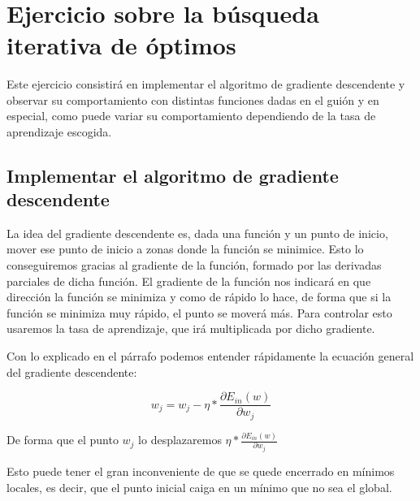 \documentclass[12pt, spanish]{article}
\makeatletter
\let\thedate\@date
\makeatother
\begin{document}
\begin{titlepage}
    {\large \thedate}\\[0.5cm]
    {\doclicenseThis}
 	
    \vfill
    
\end{titlepage}


\tableofcontents
\pagebreak


\section{Ejercicio sobre la búsqueda iterativa de óptimos}

Este ejercicio consistirá en implementar el algoritmo de gradiente descendente y observar su comportamiento con distintas funciones dadas en el guión y en especial, como puede variar su comportamiento dependiendo de la tasa de aprendizaje escogida.

\subsection{Implementar el algoritmo de gradiente descendente}

La idea del gradiente descendente es, dada una función y un punto de inicio, mover ese punto de inicio a zonas donde la función se minimice. Esto lo conseguiremos gracias al gradiente de la función, formado por las derivadas parciales de dicha función. El gradiente de la función nos indicará en que dirección la función se minimiza y como de rápido lo hace, de forma que si la función se minimiza muy rápido, el punto se moverá más. Para controlar esto usaremos la tasa de aprendizaje, que irá multiplicada por dicho gradiente.

Con lo explicado en el párrafo podemos entender rápidamente la ecuación general del gradiente descendente:

$$ w_j = w_j - \eta * \frac{\partial E_{in}(w)}{\partial w_j} $$

De forma que el punto $w_j$ lo desplazaremos $\eta * \frac{\partial E_{in}(w)}{\partial w_j} $

Esto puede tener el gran inconveniente de que se quede encerrado en mínimos locales, es decir, que el punto inicial caiga en un mínimo que no sea el global.
\end{document}
